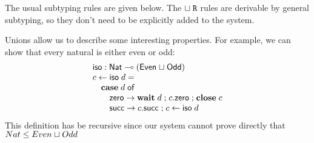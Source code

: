 \documentclass[submission,copyright,creativecommons]{eptcs}
\renewcommand{\union}{\mathrel{\sqcup}}
\newcommand{\m}[1]{\mathsf{#1}}
\newcommand{\mb}[1]{\mbox{\bf #1}}
\newcommand{\semi}{\mathrel{;}}
\begin{document}
The usual subtyping rules are given below. The $\union\Right$ rules are derivable by general subtyping, so they don't need to be explicitly added to the system.


Unions allow us to describe some interesting properties. For example, we can show that every natural is either even or odd:
\[
\begin{array}{l}
\m{iso} : \m{Nat} \lolli (\m{Even} \union \m{Odd}) \\
c \leftarrow \m{iso}\; d = \\
\quad \mb{case}\; d\; \m{of} \\
\qquad \m{zero} \rightarrow \mb{wait}\; d \semi c.\m{zero} \semi \mb{close}\; c \\
\qquad \m{succ} \rightarrow c.\m{succ} \semi c \leftarrow \m{iso}\; d
\end{array}
\]
This definition has be recursive since our system cannot prove directly that $Nat \sub Even \union Odd$
\end{document}
